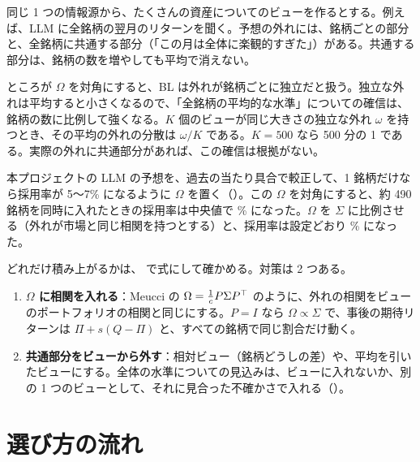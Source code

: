 同じ 1 つの情報源から、たくさんの資産についてのビューを作るとする。例えば、LLM に全銘柄の翌月のリターンを聞く。予想の外れには、銘柄ごとの部分と、全銘柄に共通する部分（「この月は全体に楽観的すぎた」）がある。共通する部分は、銘柄の数を増やしても平均で消えない。

ところが $\Omega$ を対角にすると、BL は外れが銘柄ごとに独立だと扱う。独立な外れは平均すると小さくなるので、「全銘柄の平均的な水準」についての確信は、銘柄の数に比例して強くなる。$K$ 個のビューが同じ大きさの独立な外れ $\omega$ を持つとき、その平均の外れの分散は $\omega/K$ である。$K=500$ なら 500 分の 1 である。実際の外れに共通部分があれば、この確信は根拠がない。

\begin{exbox}[本プロジェクトのデータでの例]
本プロジェクトの LLM の予想を、過去の当たり具合で較正して、1 銘柄だけなら採用率が 5〜7\% になるように $\Omega$ を置く（）。この $\Omega$ を対角にすると、約 490 銘柄を同時に入れたときの採用率は中央値で \% になった。$\Omega$ を $\Sigma$ に比例させる（外れが市場と同じ相関を持つとする）と、採用率は設定どおり \% になった。
\end{exbox}

どれだけ積み上がるかは、 で式にして確かめる。対策は 2 つある。

\begin{enumerate}
\item \textbf{$\Omega$ に相関を入れる}：Meucci の $\Omega=\frac1c P\Sigma P^{\top}$ のように、外れの相関をビューのポートフォリオの相関と同じにする。$P=I$ なら $\Omega\propto\Sigma$ で、事後の期待リターンは $\Pi+s(Q-\Pi)$ と、すべての銘柄で同じ割合だけ動く。
\item \textbf{共通部分をビューから外す}：相対ビュー（銘柄どうしの差）や、平均を引いたビューにする。全体の水準についての見込みは、ビューに入れないか、別の 1 つのビューとして、それに見合った不確かさで入れる（）。
\end{enumerate}

\section{選び方の流れ}

